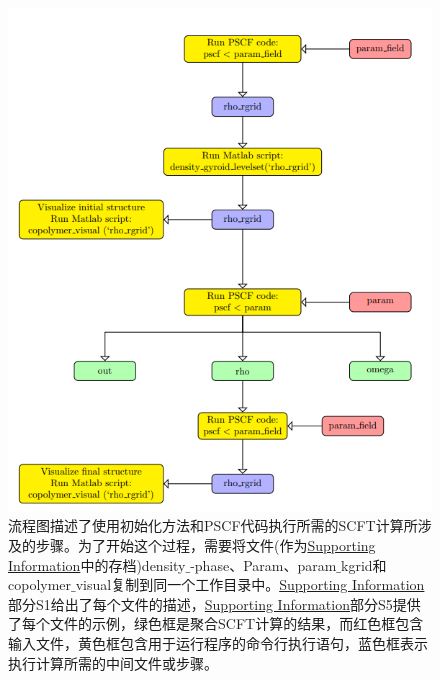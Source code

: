 \documentclass[12pt,a4paper]{article}
\begin{document}
\begin{figure}[H]
	\centering
	\includegraphics[scale=0.5]{./figures/23.png}
	\caption{流程图描述了使用初始化方法和PSCF代码执行所需的SCFT计算所涉及的步骤。为了开始这个过程，需要将文件(作为\href{http://pubs.acs.org/doi/suppl/10.1021/acs.macromol.6b00107/suppl_file/ma6b00107_si_001.pdf}{Supporting Information}中的存档)density$\_$-phase、Param、param$\_$kgrid和copolymer$\_$visual复制到同一个工作目录中。\href{http://pubs.acs.org/doi/suppl/10.1021/acs.macromol.6b00107/suppl_file/ma6b00107_si_001.pdf}{Supporting Information}部分S1给出了每个文件的描述，\href{http://pubs.acs.org/doi/suppl/10.1021/acs.macromol.6b00107/suppl_file/ma6b00107_si_001.pdf}{Supporting Information}部分S5提供了每个文件的示例，绿色框是聚合SCFT计算的结果，而红色框包含输入文件，黄色框包含用于运行程序的命令行执行语句，蓝色框表示执行计算所需的中间文件或步骤。}
	\label{figure23}
\end{figure}
\end{document}
